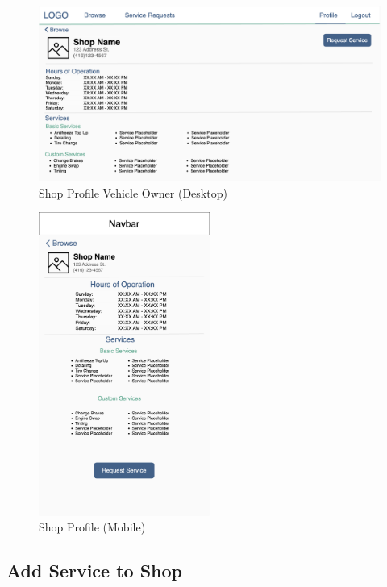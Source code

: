\documentclass[12pt, titlepage]{article}
\begin{document}
\begin{figure}[H]
	\centering
	\includegraphics[width=\textwidth]{mockups/Shop Profile (Vehicle Owner) (Desktop).png}
	\caption{Shop Profile \textemdash{} Vehicle Owner (Desktop)}
\end{figure}

\begin{figure}[H]
	\centering
	\includegraphics[width=0.5\textwidth]{mockups/Shop Profile (Mobile).png}
	\caption{Shop Profile (Mobile)}
\end{figure}

\subsection{Add Service to Shop}
\end{document}
